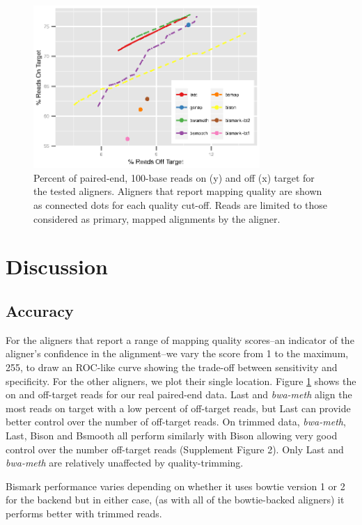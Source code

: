 \documentclass{bioinfo}
\begin{document}
\begin{figure}[!tpb]%
    \centerline{\includegraphics[width=86mm]{real-quals}}
    \caption{Percent of paired-end, 100-base reads on (y) and off (x) target for the tested aligners. Aligners that report mapping quality are shown as connected dots for each quality cut-off. Reads are limited to those considered as primary, mapped alignments by the aligner.}\label{fig:01}
\end{figure}

\section{Discussion}

\subsection{Accuracy}
For the aligners that report a range of mapping quality
scores--an indicator of the aligner's confidence in the
alignment--we vary the score from 1 to the maximum, 255, to draw an ROC-like
curve showing the trade-off between sensitivity and specificity. For the
other aligners, we plot their single location. Figure \ref{fig:01} shows
the on and off-target reads for our real paired-end data. Last and 
\textit{bwa-meth} align the most reads on target with a low percent
of off-target reads, but Last can provide better control over the number
of off-target reads. On trimmed data, \textit{bwa-meth}, Last, Bison and
Bsmooth all perform similarly with Bison allowing very good control
over the number off-target reads (Supplement Figure 2).
Only Last and \textit{bwa-meth} are relatively unaffected by quality-trimming.

Bismark performance varies depending on whether it uses bowtie version
1 or 2 for the backend but in either case, (as with all of the bowtie-backed
aligners) it performs better with trimmed reads.
\end{document}
